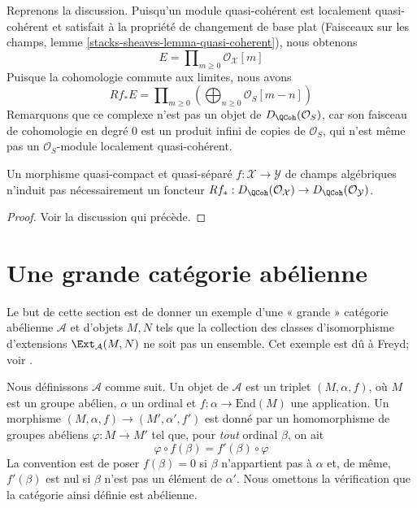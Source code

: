 \noindent
Reprenons la discussion. Puisqu'un module quasi-cohérent est localement
quasi-cohérent et satisfait à la propriété de changement de base plat
(Faisceaux sur les champs, lemme \ref{stacks-sheaves-lemma-quasi-coherent}), nous obtenons
$$
E = \prod\nolimits_{m \geq 0} \mathcal{O}_\mathcal{X}[m]
$$
Puisque la cohomologie commute
aux limites, nous avons
$$
Rf_*E = \prod\nolimits_{m \geq 0}
\left(\bigoplus\nolimits_{n \geq 0} \mathcal{O}_S[m - n]\right)
$$
Remarquons que ce complexe n'est pas un objet de $D_\QCoh(\mathcal{O}_S)$,
car son faisceau de cohomologie en degré $0$ est un produit infini de copies
de $\mathcal{O}_S$, qui n'est même pas un
$\mathcal{O}_S$-module localement quasi-cohérent.

\begin{lemma}
\label{lemma-push-not-OK}
Un morphisme quasi-compact et quasi-séparé
$f : \mathcal{X} \to \mathcal{Y}$ de champs algébriques
n'induit pas nécessairement un foncteur
$Rf_* : D_\QCoh(\mathcal{O}_\mathcal{X}) \to
D_\QCoh(\mathcal{O}_\mathcal{Y})$.
\end{lemma}

\begin{proof}
Voir la discussion qui précède.
\end{proof}



\section{Une grande catégorie abélienne}
\label{section-big}

\noindent
Le but de cette section est de donner un exemple d'une « grande » catégorie abélienne
$\mathcal{A}$ et d'objets $M, N$ tels que la collection des classes d'isomorphisme
d'extensions $\Ext_\mathcal{A}(M, N)$ ne soit pas un ensemble.
Cet exemple est dû à Freyd; voir \cite[page 131, Exercise A]{Freyd}.

\medskip\noindent
Nous définissons $\mathcal{A}$ comme suit. Un objet de $\mathcal{A}$
est un triplet $(M, \alpha, f)$, où $M$ est un groupe abélien,
$\alpha$ un ordinal et $f : \alpha \to \text{End}(M)$ une application.
Un morphisme $(M, \alpha, f) \to (M', \alpha', f')$ est donné par un homomorphisme
de groupes abéliens $\varphi : M \to M'$ tel que, pour {\it tout} ordinal $\beta$,
on ait
$$
\varphi \circ f(\beta) = f'(\beta) \circ \varphi
$$
La convention est de poser $f(\beta) = 0$ si $\beta$ n'appartient pas à
$\alpha$ et, de même, $f'(\beta)$ est nul si $\beta$ n'est pas un
élément de $\alpha'$. Nous omettons la vérification que la catégorie ainsi définie
est abélienne.

